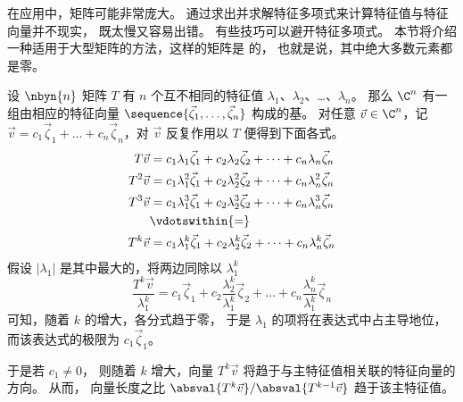 在应用中，矩阵可能非常庞大。
通过求出并求解特征多项式来计算特征值与特征向量并不现实，
既太慢又容易出错。
有些技巧可以避开特征多项式。
本节将介绍一种适用于大型矩阵的方法，这样的矩阵是
 的，
也就是说，其中绝大多数元素都是零。

设 $\nbyn{n}$ 矩阵 $T$ 有 $n$ 个互不相同的特征值
$\lambda_1$、$\lambda_2$、\ldots、$\lambda_n$。
那么 $\C^n$ 有一组由相应的特征向量
$\sequence{\vec{\zeta}_1,\dots,\vec{\zeta}_n}$ 构成的基。
对任意 $\vec{v}\in\C^n$，记
$\vec{v}=c_1\vec{\zeta}_1+\dots+c_n\vec{\zeta}_n$，对 $\vec{v}$ 反复作用以 $T$
便得到下面各式。
\begin{align*}
  T\vec{v}
      &=c_1\lambda_1\vec{\zeta}_1+c_2\lambda_2\vec{\zeta}_2+
                              \dots+c_n\lambda_n\vec{\zeta}_n  \\
  T^2\vec{v}
      &=c_1\lambda_1^2\vec{\zeta}_1+c_2\lambda_2^2\vec{\zeta}_2+
                              \dots+c_n\lambda_n^2\vec{\zeta}_n  \\
  T^3\vec{v}
      &=c_1\lambda_1^3\vec{\zeta}_1+c_2\lambda_2^3\vec{\zeta}_2+
                              \dots+c_n\lambda_n^3\vec{\zeta}_n  \\
      &\vdotswithin{=}                                            \\
  T^k\vec{v}
      &=c_1\lambda_1^k\vec{\zeta}_1+c_2\lambda_2^k\vec{\zeta}_2+
                              \dots+c_n\lambda_n^k\vec{\zeta}_n
\end{align*}
假设 $|\lambda_1|$
是其中最大的，将两边同除以 $\lambda_1^k$
\begin{equation*}
  \frac{T^k\vec{v}}{\lambda_1^k}
      =c_1\vec{\zeta}_1+c_2\frac{\lambda_2^k}{\lambda_1^k}\vec{\zeta}_2+
                    \dots+c_n\frac{\lambda_n^k}{\lambda_1^k}\vec{\zeta}_n
\end{equation*}
可知，随着 $k$ 的增大，各分式趋于零，
于是 $\lambda_1$ 的项将在表达式中占主导地位，
而该表达式的极限为 $c_1\vec{\zeta}_1$。

于是若 $c_1\neq 0$，
则随着 $k$ 增大，向量 $T^k\vec{v}$ 将趋于与主特征值相关联的特征向量的方向。
从而，
向量长度之比 $\absval{T^{k}\vec{v}}/\absval{T^{k-1}\vec{v}}$
趋于该主特征值。

